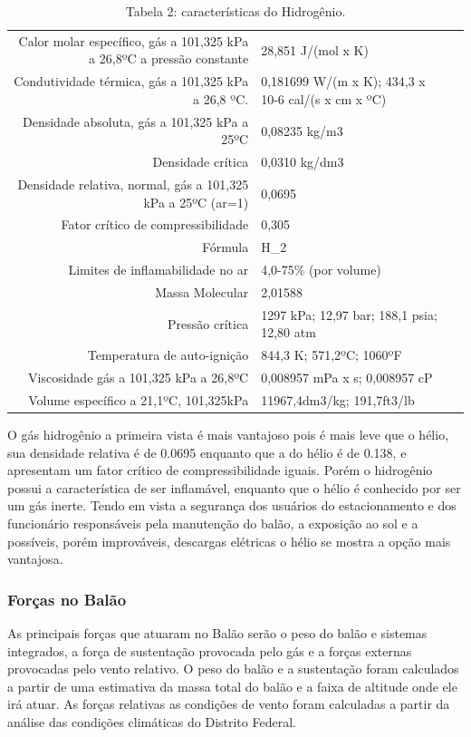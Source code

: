 \begin{table}[h]
\caption{Tabela 2: características do Hidrogênio.}
\vspace{0.5cm}
\begin{tabular}{r|lr}
\hline

Calor molar específico, gás a 101,325 kPa a 
 26,8ºC a pressão constante &  28,851 J/(mol x K)\\
Condutividade térmica, gás a 101,325 kPa a 
 26,8 ºC. & 0,181699 W/(m x K);
 434,3 x 10-6 cal/(s x cm x ºC) \\ 
Densidade absoluta, gás a 101,325 kPa a 25ºC  & 0,08235 kg/m3 \\
Densidade crítica   & 0,0310 kg/dm3 \\
Densidade relativa, normal, gás a 101,325 kPa
 a 25ºC (ar=1) &  0,0695\\
Fator crítico de compressibilidade & 0,305 \\
Fórmula   & H_2 \\
 Limites de inflamabilidade no ar & 4,0-75\% (por volume)\\
Massa Molecular & 2,01588 \\
Pressão crítica  & 1297 kPa; 12,97 bar; 188,1 psia;  12,80 atm \\
Temperatura de auto-ignição & 844,3 K; 571,2ºC; 1060ºF\\
Viscosidade gás a 101,325 kPa a 26,8ºC  & 0,008957 mPa x s; 0,008957 cP\\
Volume específico a 21,1ºC, 101,325kPa & 11967,4dm3/kg; 191,7ft3/lb\\

\hline
\end{tabular}
\end{table}

    O gás hidrogênio a primeira vista é mais vantajoso pois é mais leve que o hélio, sua densidade relativa é de 0.0695 enquanto que a do hélio é de 0.138, e apresentam um fator crítico de compressibilidade iguais. Porém o hidrogênio possui a característica de ser inflamável, enquanto que o hélio é conhecido por ser um gás inerte. Tendo em vista a segurança dos usuários do estacionamento e dos funcionário responsáveis pela manutenção do balão, a exposição ao sol e a possíveis, porém improváveis,  descargas elétricas o hélio se mostra a opção mais vantajosa.
    
    \subsubsection{Forças no Balão}
    As principais forças que atuaram no Balão serão o peso do balão e sistemas integrados, a força de sustentação provocada pelo gás e a forças externas provocadas pelo vento relativo. O peso do balão e a sustentação foram calculados a partir de uma estimativa da massa total do balão e a faixa de altitude onde ele irá atuar. As forças relativas as condições de vento foram calculadas a partir da análise das condições climáticas do Distrito Federal.
    
